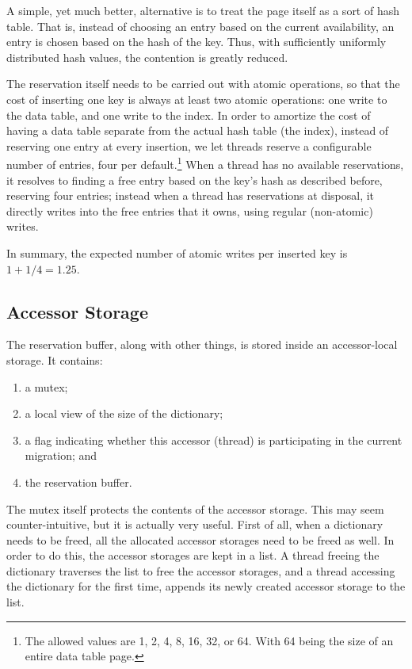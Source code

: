 A simple, yet much better, alternative is to treat the page itself as a sort of hash table.
That is, instead of choosing an entry based on the current availability, an entry is chosen based on the hash of the key.
Thus, with sufficiently uniformly distributed hash values, the contention is greatly reduced.

The reservation itself needs to be carried out with atomic operations, so that the cost of inserting one key is always at least two atomic operations: one write to the data table, and one write to the index.
In order to amortize the cost of having a data table separate from the actual hash table (the index), instead of reserving one entry at every insertion, we let threads reserve a configurable number of entries, four per default.\footnote{%
	The allowed values are 1, 2, 4, 8, 16, 32, or 64.
	With 64 being the size of an entire data table page.
}
When a thread has no available reservations, it resolves to finding a free entry based on the key's hash as described before, reserving four entries; instead when a thread has reservations at disposal, it directly writes into the free entries that it owns, using regular (non-atomic) writes.

In summary, the expected number of atomic writes per inserted key is $1 + 1/4 = 1.25$.


\subsection{Accessor Storage}\label{subsec:accessor-storage}

The reservation buffer, along with other things, is stored inside an accessor-local storage.
It contains:
\begin{enumerate}
	\item a mutex;
	\item a local view of the size of the dictionary;
	\item a flag indicating whether this accessor (thread) is participating in the current migration; and
	\item the reservation buffer.
\end{enumerate}

The mutex itself protects the contents of the accessor storage.
This may seem counter-intuitive, but it is actually very useful.
First of all, when a dictionary needs to be freed, all the allocated accessor storages need to be freed as well.
In order to do this, the accessor storages are kept in a list.
A thread freeing the dictionary traverses the list to free the accessor storages, and a thread accessing the dictionary for the first time, appends its newly created accessor storage to the list.

